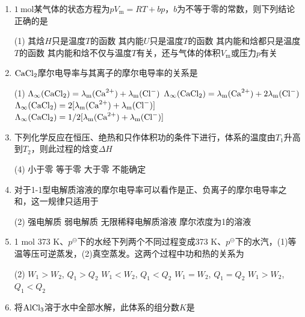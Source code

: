 \begin{enumerate}[label=\arabic*., itemsep=1.5ex]
    \begin{tasks}(4)
        \task 单分子反应
        \task 双分子反应
        \task 复合反应
        \task 不能确定
    \end{tasks}
    \item $1\ \mathrm{mol}$某气体的状态方程为$pV_\mathrm{m}=RT+bp$，$b$为不等于零的常数，则下列结论正确的是
    \begin{tasks}(1)
        \task 其焓$H$只是温度$T$的函数
        \task 其内能$U$只是温度$T$的函数
        \task 其内能和焓都只是温度$T$的函数
        \task 其内能和焓不仅与温度$T$有关，还与气体的体积$V_\mathrm{m}$或压力$p$有关
    \end{tasks}
    \item $\ce{CaCl2}$摩尔电导率与其离子的摩尔电导率的关系是
    \begin{tasks}(1)
        \task $\Lambda_\infty(\ce{CaCl2})=\lambda_\mathrm{m}(\ce{Ca^{2+}})+\lambda_\mathrm{m}(\ce{Cl-})$
        \task $\Lambda_\infty(\ce{CaCl2})=\lambda_\mathrm{m}(\ce{Ca^{2+}})+2\lambda_\mathrm{m}(\ce{Cl-})$
        \task $\Lambda_\infty(\ce{CaCl2})=2[\lambda_\mathrm{m}(\ce{Ca^{2+}})+\lambda_\mathrm{m}(\ce{Cl-})]$
        \task $\Lambda_\infty(\ce{CaCl2})=1/2[\lambda_\mathrm{m}(\ce{Ca^{2+}})+\lambda_\mathrm{m}(\ce{Cl-})]$
    \end{tasks}
    \item 下列化学反应在恒压、绝热和只作体积功的条件下进行，体系的温度由$T_1$升高到$T_2$，则此过程的焓变$\Delta H$
    \begin{tasks}(4)
        \task 小于零
        \task 等于零
        \task 大于零
        \task 不能确定
    \end{tasks}
    \item 对于1-1型电解质溶液的摩尔电导率可以看作是正、负离子的摩尔电导率之和，这一规律只适用于
    \begin{tasks}(2)
        \task 强电解质
        \task 弱电解质
        \task 无限稀释电解质溶液
        \task 摩尔浓度为1的溶液
    \end{tasks}
    \item 1 mol 373 K、$p^\ominus$下的水经下列两个不同过程变成373 K、$p^\ominus$下的水汽，(1)等温等压可逆蒸发，(2)真空蒸发。这两个过程中功和热的关系为
    \begin{tasks}(2)
        \task $W_1>W_2$, $Q_1>Q_2$
        \task $W_1<W_2$, $Q_1<Q_2$
        \task $W_1=W_2$, $Q_1=Q_2$
        \task $W_1>W_2$, $Q_1<Q_2$
    \end{tasks}
    \item 将$\ce{AlCl3}$溶于水中全部水解，此体系的组分数$K$是

\end{enumerate}
